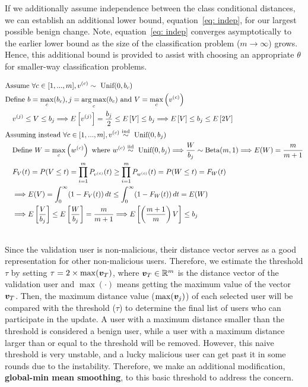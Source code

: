 \documentclass{article} %
\begin{document}
If we additionally assume independence between the class conditional distances, we can establish an additional lower bound, equation~\ref{eq: indep}, for our largest possible benign change. Note, equation~\ref{eq: indep} converges asymptotically to the earlier lower bound as the size of the classification problem ($m \rightarrow \infty$) grows. Hence, this additional bound is provided to assist with choosing an appropriate $\theta$ for smaller-way classification problems.

\begin{align}
    & \textrm{Assume } \forall c \in [1,...,m], v^{(c)} \sim \textrm{ Unif}(0, b_c) \nonumber \\
    & \textrm{Define } b = \max_c (b_c), j = \operatorname*{arg\,max}_c (b_c) \textrm{ and } V = \max_c \left( v^{(c)} \right) \nonumber \\
    & \quad v^{(j)} \leq V \leq b_j \Longrightarrow E \left[ v^{(j)} \right] = \dfrac{b_j}{2} \leq E \left[ V \right] \leq b_j  \Longrightarrow E \left[ V \right] \leq b_j \leq E \left[ 2 V \right] \label{eq: dep} \\
    & \textrm{Assuming instead } \forall c \in [1,...,m], v^{(c)} \overset{\textrm{ind}}{\sim} \textrm{ Unif}(0, b_j) \nonumber \\
    & \quad \textrm{Define } W = \max_c \left( w^{(c)} \right) \textrm{ where } w^{(c)} \overset{\textrm{iid}}{\sim} \textrm{ Unif}(0, b_j) \Longrightarrow \dfrac{W}{b_j} \sim \textrm{Beta}(m, 1) \Longrightarrow E(W) = \dfrac{m}{m + 1} \nonumber \\
    & \quad F_V(t) = P(V \leq t) = \prod_{i = 1}^m P_{v^{(c)}}(t) \geq \prod_{i = 1}^m P_{w^{(c)}}(t) = P(W \leq t) = F_W(t) \nonumber \\
    & \quad \Longrightarrow E(V) = \int_0^\infty (1 - F_V(t)) \,dt \leq \int_0^\infty (1 - F_W(t)) \,dt = E(W) \nonumber \\
    & \quad \Longrightarrow E \left[ \dfrac{V}{b_j} \right] \leq E \left[ \dfrac{W}{b_j} \right] = \dfrac{m}{m + 1} \Longrightarrow E \left[ \left( \dfrac{m + 1}{m} \right) V \right] \leq b_j \label{eq: indep} \\
    \nonumber 
\end{align}


Since the validation user is non-malicious, their distance vector serves as a good representation for other non-malicious users. Therefore, we estimate the threshold $\tau$ by setting $\tau=2\times\max({\bm{v}}_T)$, where ${\bm{v}}_T\in{\mathbb{R}}^m$ is the distance vector of the validation user and $\max(\cdot)$ means getting the maximum value of the vector ${\bm{v}}_T$. Then, the maximum distance value ($\max({\bm{v}}_j)$) of each selected user will be compared with the threshold ($\tau$) to determine the final list of users who can participate in the update. A user with a maximum distance smaller than the threshold is considered a benign user, while a user with a maximum distance larger than or equal to the threshold will be removed. However, this naive threshold is very unstable, and a lucky malicious user can get past it in some rounds due to the instability. Therefore, we make an additional modification, {\bf global-min mean smoothing}, to this basic threshold to address the concern.
\end{document}

